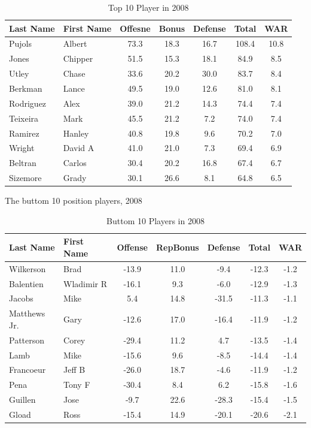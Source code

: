 \documentclass[12pt]{article}
\begin{document}
\begin{table}[htbp]
  \caption{Top 10 Player in 2008}
  \label{tab:top} 
  \centering
  \begin{tabular}{|l|l|c|c|c|c|c|}
     \hline
     \textbf{Last Name} & \textbf{First Name} & \textbf{Offesne} & \textbf{Bonus} & \textbf{Defense} & \textbf{Total} & \textbf{WAR}\\
     \hline
     Pujols & Albert & 73.3 & 18.3 & 16.7 & 108.4 & 10.8\\
     Jones & Chipper & 51.5 & 15.3 & 18.1 & 84.9 & 8.5\\
     Utley & Chase & 33.6 & 20.2 & 30.0 & 83.7 & 8.4\\
     Berkman & Lance & 49.5 & 19.0 & 12.6 & 81.0 & 8.1\\
     Rodriguez & Alex & 39.0 & 21.2 & 14.3 & 74.4 & 7.4\\
     Teixeira & Mark & 45.5 & 21.2 & 7.2 & 74.0 & 7.4\\
     Ramirez & Hanley & 40.8 & 19.8 & 9.6 & 70.2 & 7.0\\
     Wright & David A & 41.0 & 21.0 & 7.3 & 69.4 & 6.9\\
     Beltran & Carlos & 30.4 & 20.2 & 16.8 & 67.4 & 6.7\\
     Sizemore & Grady & 30.1 & 26.6 & 8.1 & 64.8 & 6.5\\
    \hline
  \end{tabular}
\end{table}

The buttom 10 position players, 2008
\begin{table}[htbp]
  \caption{Buttom 10 Players in 2008}
  \label{tab:buttom} 
  \centering
  \begin{tabular}{|l|l|c|c|c|c|c|}
     \hline
     \textbf{Last Name} & \textbf{First Name} & \textbf{Offense} & \textbf{RepBonus} & \textbf{Defense} & \textbf{Total} & \textbf{WAR}\\
     \hline
     Wilkerson & Brad & -13.9 & 11.0 & -9.4 & -12.3 & -1.2\\
     Balentien & Wladimir R & -16.1 & 9.3 & -6.0 & -12.9 & -1.3\\
     Jacobs & Mike & 5.4 & 14.8 & -31.5 & -11.3 & -1.1\\
     Matthews Jr. & Gary & -12.6 & 17.0 & -16.4 & -11.9 & -1.2\\
     Patterson & Corey & -29.4 & 11.2 & 4.7 & -13.5 & -1.4\\
     Lamb & Mike & -15.6 & 9.6 & -8.5 & -14.4 & -1.4\\
     Francoeur & Jeff B & -26.0 & 18.7 & -4.6 & -11.9 & -1.2\\
     Pena & Tony F & -30.4 & 8.4 & 6.2 & -15.8 & -1.6\\
     Guillen & Jose & -9.7 & 22.6 & -28.3 & -15.4 & -1.5\\
     Gload & Ross & -15.4 & 14.9 & -20.1 & -20.6 & -2.1\\
    \hline
  \end{tabular}
\end{table}
\end{document}

